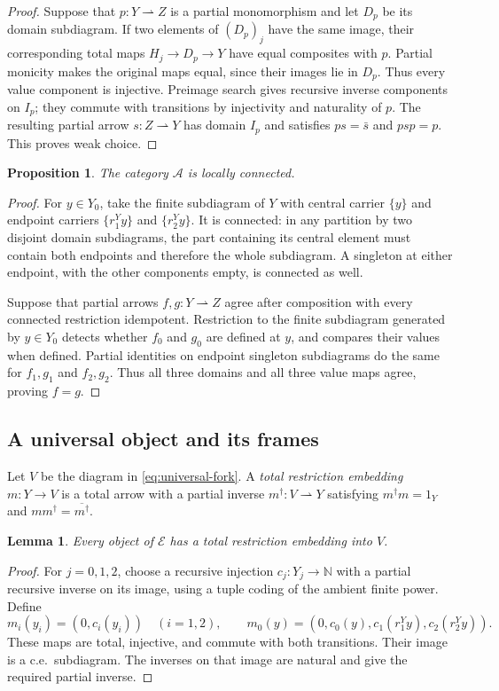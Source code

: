\documentclass[11pt]{article}
\newtheorem{proposition}[theorem]{Proposition}
\newtheorem{lemma}[theorem]{Lemma}
\newcommand{\N}{\mathbb N}
\begin{document}
\begin{proof}
Suppose that $p:Y\rightharpoonup Z$ is a partial monomorphism
and let $D_p$ be its domain subdiagram. If two elements of $(D_p)_j$
have the same image, their corresponding total maps
$H_j\to D_p\to Y$ have equal composites with $p$.
Partial monicity makes the original maps equal, since their
images lie in $D_p$. Thus every value component is injective.
Preimage search gives recursive inverse components on $I_p$;
they commute with transitions by injectivity and naturality of $p$.
The resulting partial arrow $s:Z\rightharpoonup Y$ has domain
$I_p$ and satisfies $ps=\bar s$ and $psp=p$.
This proves weak choice.
\end{proof}

\begin{proposition}\label{prop:fork-local}
The category $\mathcal A$ is locally connected.
\end{proposition}
\begin{proof}
For $y\in Y_0$, take the finite subdiagram of $Y$ with central
carrier $\{y\}$ and endpoint carriers
$\{r_1^Yy\}$ and $\{r_2^Yy\}$. It is connected: in any partition
by two disjoint domain subdiagrams, the part containing its central
element must contain both endpoints and therefore the whole
subdiagram. A singleton at either endpoint, with the other
components empty, is connected as well.

Suppose that partial arrows $f,g:Y\rightharpoonup Z$ agree
after composition with every connected restriction idempotent.
Restriction to the
finite subdiagram generated by $y\in Y_0$ detects whether
$f_0$ and $g_0$ are defined at $y$, and compares their values
when defined. Partial identities on endpoint singleton subdiagrams do
the same for $f_1,g_1$ and $f_2,g_2$. Thus all three domains and all three
value maps agree, proving $f=g$.
\end{proof}

\subsection{A universal object and its frames}

Let $V$ be the diagram in \eqref{eq:universal-fork}.
A \emph{total restriction embedding} $m:Y\to V$ is a total
arrow with a partial inverse $m^\dagger:V\rightharpoonup Y$
satisfying $m^\dagger m=1_Y$ and $mm^\dagger=\overline{m^\dagger}$.

\begin{lemma}\label{lem:fork-dominance}
Every object of $\mathcal E$ has a total restriction embedding
into $V$.
\end{lemma}
\begin{proof}
For $j=0,1,2$, choose a recursive injection $c_j:Y_j\to\N$
with a partial recursive inverse on its image, using a tuple
coding of the ambient finite power. Define
\[
 m_i(y_i)=(0,c_i(y_i))\quad(i=1,2),\qquad
 m_0(y)=(0,c_0(y),c_1(r_1^Yy),c_2(r_2^Yy)).
\]
These maps are total, injective, and commute with both transitions.
Their image is a c.e.\ subdiagram. The inverses on that image
are natural and give the required partial inverse.
\end{proof}
\end{document}
